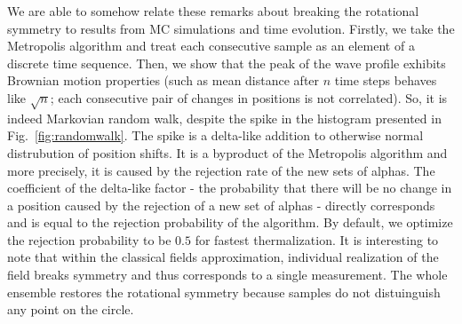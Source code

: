 \documentclass[aps,pra,reprint]{revtex4-2}
\begin{document}
We are able to somehow relate these remarks about breaking the rotational 
symmetry to results from MC simulations and time evolution. Firstly, we take 
the Metropolis algorithm and treat each consecutive sample as an element of 
a discrete time sequence. Then, we show that the peak of the wave profile 
exhibits Brownian motion properties (such as mean distance after $n$ time steps 
behaves like $\sqrt{n}$; each consecutive pair of changes in positions is not 
correlated). So, it is indeed Markovian random walk, despite the spike in the 
histogram presented in Fig.~\ref{fig:randomwalk}. The spike is a delta-like 
addition to otherwise normal distrubution of position shifts. It is a byproduct 
of the Metropolis algorithm and more precisely, it is caused by the rejection 
rate of the new sets of alphas. The coefficient of the delta-like factor - the 
probability that there will be no change in a position caused by the rejection 
of a new set of alphas - directly corresponds and is equal to the rejection 
probability of the algorithm. By default, we optimize the rejection probability 
to be $0.5$ for fastest thermalization. It is interesting to note that within 
the classical fields approximation, individual realization of the field breaks 
symmetry and thus corresponds to a single measurement. The whole ensemble 
restores the rotational symmetry because samples do not distuinguish any point 
on the circle.
    
\end{document}
